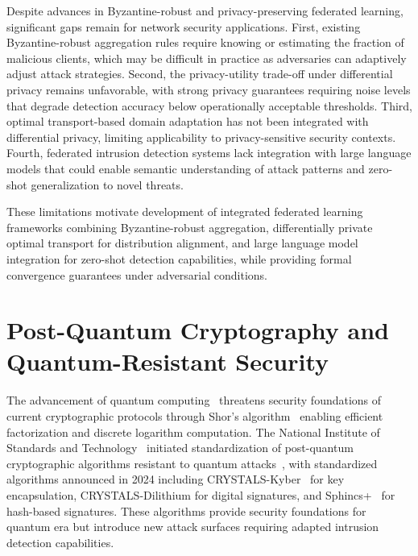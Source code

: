 Despite advances in Byzantine-robust and privacy-preserving federated learning, significant gaps remain for network security applications. First, existing Byzantine-robust aggregation rules require knowing or estimating the fraction of malicious clients, which may be difficult in practice as adversaries can adaptively adjust attack strategies. Second, the privacy-utility trade-off under differential privacy remains unfavorable, with strong privacy guarantees requiring noise levels that degrade detection accuracy below operationally acceptable thresholds. Third, optimal transport-based domain adaptation has not been integrated with differential privacy, limiting applicability to privacy-sensitive security contexts. Fourth, federated intrusion detection systems lack integration with large language models that could enable semantic understanding of attack patterns and zero-shot generalization to novel threats.

These limitations motivate development of integrated federated learning frameworks combining Byzantine-robust aggregation, differentially private optimal transport for distribution alignment, and large language model integration for zero-shot detection capabilities, while providing formal convergence guarantees under adversarial conditions.

\section{Post-Quantum Cryptography and Quantum-Resistant Security}
\label{sec:lit_postquantum}

The advancement of quantum computing~\cite{nielsen2010quantum} threatens security foundations of current cryptographic protocols through Shor's algorithm~\cite{shor1999polynomial} enabling efficient factorization and discrete logarithm computation. The National Institute of Standards and Technology~\cite{alagic2020nist} initiated standardization of post-quantum cryptographic algorithms resistant to quantum attacks~\cite{bernstein2017post}, with standardized algorithms announced in 2024 including CRYSTALS-Kyber~\cite{avanzi2019crystals} for key encapsulation, CRYSTALS-Dilithium for digital signatures, and Sphincs+~\cite{bernstein2019sphincs} for hash-based signatures. These algorithms provide security foundations for quantum era but introduce new attack surfaces requiring adapted intrusion detection capabilities.

